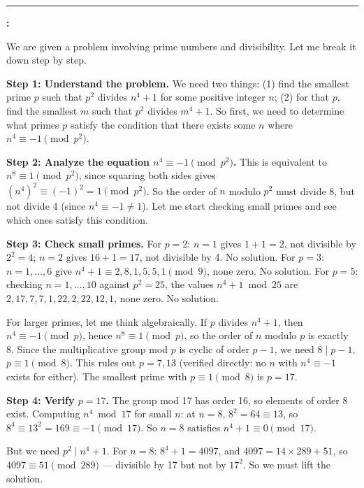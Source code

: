 \begin{ReasoningBox}[title={Case Study: Math Reasoning (Pre-RL / Post-RL Setting)}, breakable]
\medskip
\noindent\rule{\linewidth}{0.4pt}
\medskip

\textbf{\ours:}

We are given a problem involving prime numbers and divisibility. Let me break it down step by step.

\textbf{Step 1: Understand the problem.} We need two things: (1) find the smallest prime $p$ such that $p^2$ divides $n^4+1$ for some positive integer $n$; (2) for that $p$, find the smallest $m$ such that $p^2$ divides $m^4+1$. So first, we need to determine what primes $p$ satisfy the condition that there exists some $n$ where $n^4 \equiv -1 \pmod{p^2}$.

\textbf{Step 2: Analyze the equation $n^4 \equiv -1 \pmod{p^2}$.} This is equivalent to $n^8 \equiv 1 \pmod{p^2}$, since squaring both sides gives $(n^4)^2 \equiv (-1)^2 = 1 \pmod{p^2}$. So the order of $n$ modulo $p^2$ must divide 8, but not divide 4 (since $n^4 \equiv -1 \neq 1$). Let me start checking small primes and see which ones satisfy this condition.

\textbf{Step 3: Check small primes.}
For $p=2$: $n=1$ gives $1+1=2$, not divisible by $2^2=4$; $n=2$ gives $16+1=17$, not divisible by 4. No solution.
For $p=3$: $n=1,\dots,6$ give $n^4+1 \equiv 2, 8, 1, 5, 5, 1 \pmod 9$, none zero. No solution.
For $p=5$: checking $n=1,\dots,10$ against $p^2=25$, the values $n^4+1 \bmod 25$ are $2, 17, 7, 7, 1, 22, 2, 22, 12, 1$, none zero. No solution.

For larger primes, let me think algebraically. If $p$ divides $n^4+1$, then $n^4 \equiv -1 \pmod p$, hence $n^8 \equiv 1 \pmod p$, so the order of $n$ modulo $p$ is exactly 8. Since the multiplicative group mod $p$ is cyclic of order $p-1$, we need $8 \mid p-1$, \ie $p \equiv 1 \pmod 8$. This rules out $p = 7, 13$ (verified directly: no $n$ with $n^4 \equiv -1$ exists for either). The smallest prime with $p \equiv 1 \pmod 8$ is $p=17$.

\textbf{Step 4: Verify $p=17$.} The group mod 17 has order 16, so elements of order 8 exist. Computing $n^4 \bmod 17$ for small $n$: at $n=8$, $8^2 = 64 \equiv 13$, so $8^4 \equiv 13^2 = 169 \equiv -1 \pmod{17}$. So $n=8$ satisfies $n^4+1 \equiv 0 \pmod{17}$.

But we need $p^2 \mid n^4+1$. For $n=8$: $8^4+1 = 4097$, and $4097 = 14 \times 289 + 51$, so $4097 \equiv 51 \pmod{289}$ --- divisible by 17 but not by $17^2$. So we must lift the solution.


\end{ReasoningBox}
